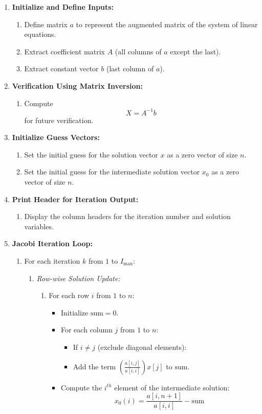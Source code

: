 \documentclass[a4paper,12pt]{article}
\begin{document}
\begin{enumerate}
	\item \textbf{Initialize and Define Inputs:}
	\begin{enumerate}
		\item Define matrix $a$ to represent the augmented matrix of the system of linear equations.
		\item Extract coefficient matrix $A$ (all columns of $a$ except the last).
		\item Extract constant vector $b$ (last column of $a$).
	\end{enumerate}
	
	\item \textbf{Verification Using Matrix Inversion:}
	\begin{enumerate}
		\item Compute $$ X = A^{-1}b $$ for future verification.
	\end{enumerate}
	
	\item \textbf{Initialize Guess Vectors:}
	\begin{enumerate}
		\item Set the initial guess for the solution vector $x$ as a zero vector of size $n$.
		\item Set the initial guess for the intermediate solution vector $x_0$ as a zero vector of size $n$.
	\end{enumerate}
	
	\item \textbf{Print Header for Iteration Output:}
	\begin{enumerate}
		\item Display the column headers for the iteration number and solution variables.
	\end{enumerate}
	
	\item \textbf{Jacobi Iteration Loop:}
	\begin{enumerate}
		\item For each iteration $k$ from $1$ to $I_{\text{max}}$:
		\begin{enumerate}
			\item \textit{Row-wise Solution Update:}
			\begin{enumerate}
				\item For each row $i$ from $1$ to $n$:
				\begin{itemize}
					\item Initialize $\text{sum} = 0$.
					\item For each column $j$ from $1$ to $n$:
					\begin{itemize}
						\item If $i \ne j$ (exclude diagonal elements):
						\item Add the term $\left( \frac{a[i,j]}{a[i,i]} \right) x[j]$ to $\text{sum}$.
					\end{itemize}
					\item Compute the $i^{th}$ element of the intermediate solution:
					$$
					x_0(i) = \frac{a[i,n+1]}{a[i,i]} - \text{sum}
					$$
				\end{itemize}
			\end{enumerate}
			

\end{enumerate}
\end{enumerate}
\end{enumerate}
\end{document}
